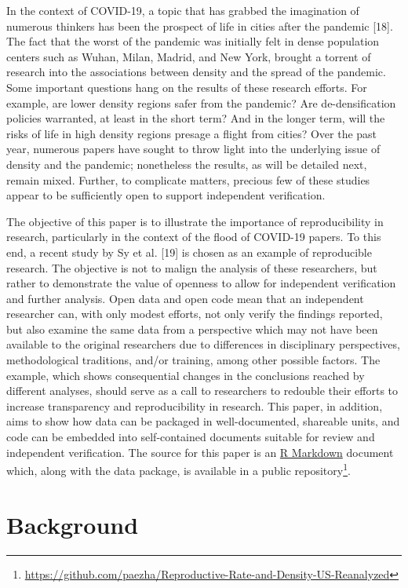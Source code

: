 \documentclass[10pt,letterpaper]{article}
\begin{document}
In the context of COVID-19, a topic that has grabbed the imagination of
numerous thinkers has been the prospect of life in cities after the
pandemic {[}18{]}. The fact that the worst of the pandemic was initially
felt in dense population centers such as Wuhan, Milan, Madrid, and New
York, brought a torrent of research into the associations between
density and the spread of the pandemic. Some important questions hang on
the results of these research efforts. For example, are lower density
regions safer from the pandemic? Are de-densification policies
warranted, at least in the short term? And in the longer term, will the
risks of life in high density regions presage a flight from cities? Over
the past year, numerous papers have sought to throw light into the
underlying issue of density and the pandemic; nonetheless the results,
as will be detailed next, remain mixed. Further, to complicate matters,
precious few of these studies appear to be sufficiently open to support
independent verification.

The objective of this paper is to illustrate the importance of
reproducibility in research, particularly in the context of the flood of
COVID-19 papers. To this end, a recent study by Sy et al. {[}19{]} is
chosen as an example of reproducible research. The objective is not to
malign the analysis of these researchers, but rather to demonstrate the
value of openness to allow for independent verification and further
analysis. Open data and open code mean that an independent researcher
can, with only modest efforts, not only verify the findings reported,
but also examine the same data from a perspective which may not have
been available to the original researchers due to differences in
disciplinary perspectives, methodological traditions, and/or training,
among other possible factors. The example, which shows consequential
changes in the conclusions reached by different analyses, should serve
as a call to researchers to redouble their efforts to increase
transparency and reproducibility in research. This paper, in addition,
aims to show how data can be packaged in well-documented, shareable
units, and code can be embedded into self-contained documents suitable
for review and independent verification. The source for this paper is an
\href{http://rmarkdown.rstudio.com}{R Markdown} document which, along
with the data package, is available in a public repository\footnote{\url{https://github.com/paezha/Reproductive-Rate-and-Density-US-Reanalyzed}}.

\hypertarget{background}{%
\section{Background}\label{background}}
\end{document}
